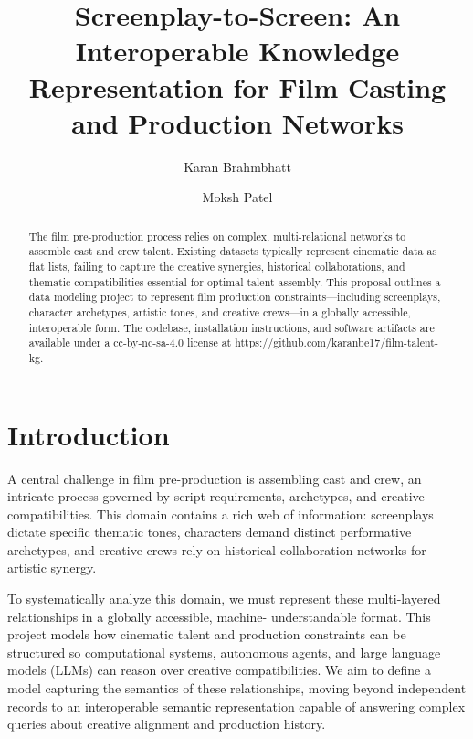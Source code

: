 \documentclass[sigconf]{acmart}
\begin{document}
\title{Screenplay-to-Screen: An Interoperable Knowledge Representation for Film Casting and Production Networks}

\author{Karan Brahmbhatt}

\author{Moksh Patel}

\begin{abstract}
The film pre-production process relies on complex, multi-relational networks to assemble cast and crew talent. Existing datasets typically represent cinematic data as flat lists, failing to capture the creative synergies, historical collaborations, and thematic compatibilities essential for optimal talent assembly. This proposal outlines a data modeling project to represent film production constraints—including screenplays, character archetypes, artistic tones, and creative crews—in a globally accessible, interoperable form. The codebase, installation instructions, and software artifacts are available under a cc-by-nc-sa-4.0 license at https://github.com/karanbe17/film-talent-kg.
\end{abstract}


\maketitle

\section{Introduction}
A central challenge in film pre-production is assembling cast and crew, an intricate process governed by script requirements, archetypes, and creative compatibilities. This domain contains a rich web of information: screenplays dictate specific thematic tones, characters demand distinct performative archetypes, and creative crews rely on historical collaboration networks for artistic synergy.

To systematically analyze this domain, we must represent these multi-layered relationships in a globally accessible, machine- understandable format. This project models how cinematic talent and production constraints can be structured so computational systems, autonomous agents, and large language models (LLMs) can reason over creative compatibilities. We aim to define a model capturing the semantics of these relationships, moving beyond independent records to an interoperable semantic representation capable of answering complex queries about creative alignment and production history.
\end{document}
